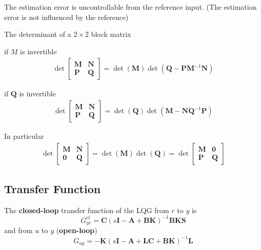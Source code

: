 \newpar{}

The estimation error is uncontrollable from the reference input. (The estimation error is not influenced by the reference)

\newpar{}

The determinant of a $2\times2$ block matrix

if $M$ is invertible
\begin{align*}
    \det\begin{bmatrix}
            \mathbf{M} & \mathbf{N} \\
            \mathbf{P} & \mathbf{Q}
        \end{bmatrix}
    = \det(\mathbf{M})\det(\mathbf{Q}-\mathbf{PM}^{-1}\mathbf{N})
\end{align*}

if $\mathbf{Q}$ is invertible
\begin{align*}
    \det\begin{bmatrix}
            \mathbf{M} & \mathbf{N} \\
            \mathbf{P} & \mathbf{Q}
        \end{bmatrix}
    = \det(\mathbf{Q})\det(\mathbf{M}-\mathbf{NQ}^{-1}\mathbf{P})
\end{align*}

In particular
\begin{align*}
    \det\begin{bmatrix}
            \mathbf{M} & \mathbf{N} \\
            \mathbf{0} & \mathbf{Q}
        \end{bmatrix}
    = \det(\mathbf{M})\det(\mathbf{Q}) =
    \det\begin{bmatrix}
            \mathbf{M} & \mathbf{0} \\
            \mathbf{P} & \mathbf{Q}
        \end{bmatrix}
\end{align*}

\subsection{Transfer Function}
The \textbf{closed-loop} transfer function of the LQG from $r$ to $y$ is
\begin{equation*}
    G_{yr}^{cl} = \mathbf{C}{(s\mathbf{I}-\mathbf{A}+\mathbf{BK})}^{-1}\mathbf{BKS}
\end{equation*}
and from $u$ to $y$ (\textbf{open-loop})
\begin{equation*}
    G_{uy} = -\mathbf{K}{(s\mathbf{I}-\mathbf{A}+\mathbf{LC}+\mathbf{BK})}^{-1}\mathbf{L}
\end{equation*}

